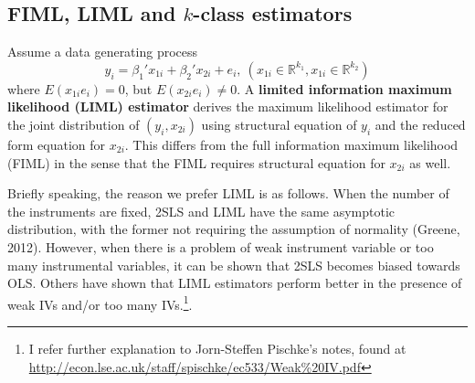 \documentclass[12pt]{article}
\theoremstyle{definition}
\theoremstyle{property}
\theoremstyle{assumption}
\theoremstyle{example}
\theoremstyle{comment}
\begin{document}
\subsection{FIML, LIML and $k$-class estimators}
Assume a data generating process
\[
y_ i = \beta_1' x_{1i}+ \beta_2' x_{2i}+e_i,\  (x_{1i}\in\mathbb{R}^{k_1}, x_{1i}\in\mathbb{R}^{k_2})
\]
where $E(x_{1i}e_i)=0$, but $E(x_{2i}e_i)\neq0$. A \textbf{limited information maximum likelihood (LIML) estimator} derives the maximum likelihood estimator for the joint distribution of $(y_i, x_{2i})$ using structural equation of $y_i$ and the reduced form equation for $x_{2i}$. This differs from the full information maximum likelihood (FIML) in the sense that the FIML requires structural equation for $x_{2i}$ as well. \par
Briefly speaking, the reason we prefer LIML is as follows. When the number of the instruments are fixed, 2SLS and LIML have the same asymptotic distribution, with the former not requiring the assumption of normality (Greene, 2012). However, when there is a problem of weak instrument variable or too many instrumental variables, it can be shown that 2SLS becomes biased towards OLS. Others have shown that LIML estimators perform better in the presence of weak IVs and/or too many IVs.\footnote{I refer further explanation to Jorn-Steffen Pischke's notes, found at \url{http://econ.lse.ac.uk/staff/spischke/ec533/Weak\%20IV.pdf}}. \par
\end{document}
